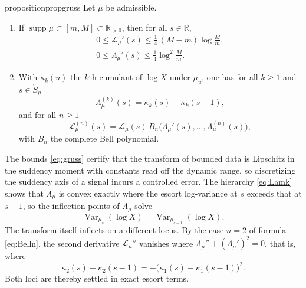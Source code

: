 \documentclass[sn-mathphys-num]{sn-jnl}
\theoremstyle{thmstyleone}%
\theoremstyle{thmstyletwo}%
\theoremstyle{thmstylethree}%
\theoremstyle{thmstyleone}%
\providecommand{\R}{\mathbb{R}}
\providecommand{\Var}{\operatorname{Var}}
\providecommand{\Rpos}{\mathbb{R}_{>0}}
\providecommand{\Leh}{\mathscr{L}}
\providecommand{\supp}{\operatorname{supp}}
\begin{document}
	\begin{restatable}{proposition}{propgruss}\label{prop:gruss}
		Let $\mu$ be admissible.
		\begin{enumerate}[label=\textup{(\roman*)},leftmargin=2.2em]
			\item If $\supp\mu\subset[m,M]\subset\Rpos$, then for all
			$s\in\R$,
			\begin{equation}\label{eq:gruss}
				\begin{gathered}
					0\le\Leh_\mu'(s)\le\tfrac14\,(M-m)\log\tfrac Mm,\\
					0\le\Lambda_\mu'(s)\le\tfrac14\log^2\tfrac Mm .
				\end{gathered}
			\end{equation}
			\item With $\kappa_k(u)$ the $k$th cumulant of $\log X$ under
			$\mu_u$, one has for all $k\ge1$ and $s\in\mathring S_\mu$
			\begin{equation}\label{eq:Lamk}
				\Lambda_\mu^{(k)}(s)=\kappa_k(s)-\kappa_k(s-1),
			\end{equation}
			and for all $n\ge1$
			\begin{equation}\label{eq:Belln}
				\Leh_\mu^{(n)}(s)=\Leh_\mu(s)\,
				B_n\bigl(\Lambda_\mu'(s),\dots,\Lambda_\mu^{(n)}(s)\bigr),
			\end{equation}
			with $B_n$ the complete Bell polynomial.
		\end{enumerate}
	\end{restatable}
	
	The bounds \eqref{eq:gruss} certify that the transform of bounded
	data is Lipschitz in the suddency moment with constants read off the
	dynamic range, so discretizing the suddency axis of a signal incurs a
	controlled error. The hierarchy \eqref{eq:Lamk} shows that
	$\Lambda_\mu$ is convex exactly where the escort log-variance at $s$
	exceeds that at $s-1$, so the inflection points of $\Lambda_\mu$
	solve
	\begin{equation}\label{eq:inflection}
		\Var_{\mu_s}(\log X)=\Var_{\mu_{s-1}}(\log X).
	\end{equation}
	The transform itself inflects on a different locus. By the case
	$n=2$ of formula \eqref{eq:Belln}, the second derivative
	$\Leh_\mu''$ vanishes where
	$\Lambda_\mu''+(\Lambda_\mu')^{2}=0$, that is, where
	\begin{equation}\label{eq:inflectionL}
		\kappa_2(s)-\kappa_2(s-1)
		=-\bigl(\kappa_1(s)-\kappa_1(s-1)\bigr)^{2}.
	\end{equation}
	Both loci are thereby settled in exact escort terms.
	
\end{document}
